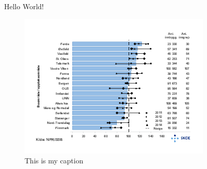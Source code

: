 \documentclass{article}
\begin{document}
Hello World!

\begin{figure}[h]
\includegraphics{fig.png}
\caption{This is my caption}
\end{figure}
\end{document}
